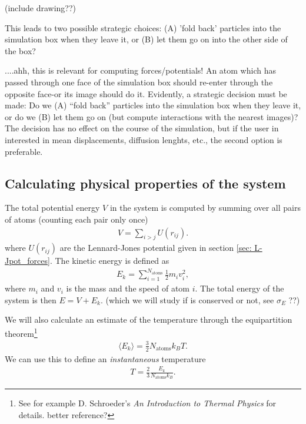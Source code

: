 \documentclass[11pt,a4wide]{article}
\begin{document}
(include drawing??)

This leads to two possible strategic choices: (A) 'fold back' particles into the simulation box when they leave it, or (B) let them go on into the other side of the box?

....ahh, this is relevant for computing forces/potentials!
An atom which has passed through one face of the simulation box should re-enter through the opposite face-or its image should do it. Evidently, a strategic decision must be made: Do we (A) “fold back” particles into the simulation box when they leave it, or do we (B) let them go on (but compute interactions with the nearest images)? The decision has no effect on the course of the simulation, but if the user in interested in mean displacements, diffusion lenghts, etc., the second option is preferable.




  
  
\subsection{Calculating physical properties of the system}
The total potential energy $V$ in the system is computed by summing over all pairs of atoms (counting each pair only once) 
\begin{align}
	V = \sum_{i>j} U(r_{ij}).
\end{align}
where $U(r_{ij})$ are the Lennard-Jones potential given in section \ref{sec: L-Jpot_forces}. The kinetic energy is defined as
\begin{align}
	E_k = \sum_{i=1}^{N_\text{atoms}} \frac{1}{2} m_i v_i^2,
\end{align}
where $m_i$ and $v_i$ is the mass and the speed of atom $i$. The total energy of the system is then $E = V + E_k$. (which we will study if is conserved or not, see $\sigma_E$ ??)

We will also calculate an estimate of the temperature through the equipartition theorem\footnote{See for example D. Schroeder's \textit{An Introduction to Thermal Physics} for details. better reference?}
\begin{align}
	\langle E_k \rangle = \frac{3}{2}N_\text{atoms} k_B T.
\end{align}
We can use this to define an \textit{instantaneous} temperature
\begin{align}
	\label{eq:temperature}
	T = \frac{2}{3}\frac{E_k}{N_\text{atoms} k_B}.
\end{align}
\end{document}
